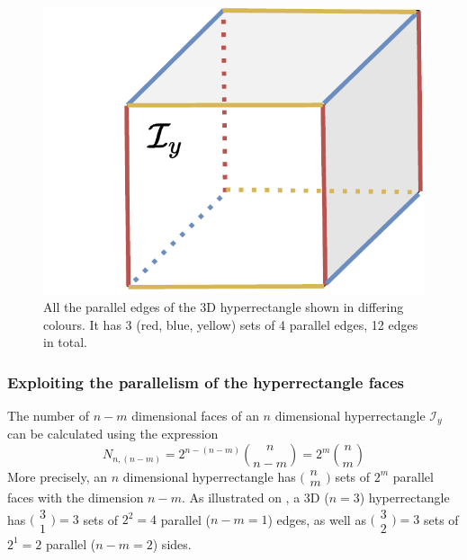 \begin{figure}
\vspace{-0.5cm}
    \centering
    \includegraphics[trim=1.5cm 0 0 0,clip=true,width=\linewidth]{Papers/images/parallel.pdf}
    \caption{All the parallel edges of the 3D hyperrectangle shown in differing colours. It has 3 (red, blue, yellow) sets of 4 parallel edges, 12 edges in total.}
    \label{fig:parallel}
\end{figure}
\subsubsection{Exploiting the parallelism of the hyperrectangle faces} 
The number of $n-m$ dimensional faces of an $n$ dimensional hyperrectangle $\mathcal{I}_y$ can be calculated using the expression
$$
N_{n,(n-m)}= 2^{n-(n-m)}\binom{n}{n-m} =  2^{m}\binom{n}{m} 
$$
More precisely, an $n$ dimensional hyperrectangle has $\big(\begin{smallmatrix}n\\m\end{smallmatrix}\big)$ sets of $2^m$ parallel faces with the dimension $n\!-\!m$. 
As illustrated on , a 3D ($n\!=\!3$) hyperrectangle has $\big(\begin{smallmatrix}3\\1\end{smallmatrix}\big)\!=\!3$ sets of $2^{2}\!=\!4$ parallel ($n\!-\!m\!=\!1$) edges, as well as $\big(\begin{smallmatrix}3\\2\end{smallmatrix}\big)=3$ sets of $2^1\!=\!2$ parallel ($n\!-\!m\!=\!2$) sides. 

